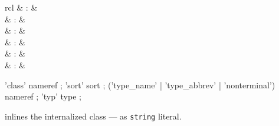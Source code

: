 \begin{isabellebody}
\begin{isamarkuptext}
\begin{description}
  \end{description}%
\end{isamarkuptext}%
\isamarkuptrue%
%
\endisatagmlref
{\isafoldmlref}%
%
\isadelimmlref
%
\endisadelimmlref
%
\isadelimmlantiq
%
\endisadelimmlantiq
%
\isatagmlantiq
%
\begin{isamarkuptext}%
\begin{matharray}{rcl}
  \hypertarget{ML antiquotation.class}{\hyperlink{ML antiquotation.class}{\mbox{}}} & : &  \\
  \hypertarget{ML antiquotation.sort}{\hyperlink{ML antiquotation.sort}{\mbox{}}} & : &  \\
  \hypertarget{ML antiquotation.type-name}{\hyperlink{ML antiquotation.type-name}{\mbox{}}} & : &  \\
  \hypertarget{ML antiquotation.type-abbrev}{\hyperlink{ML antiquotation.type-abbrev}{\mbox{}}} & : &  \\
  \hypertarget{ML antiquotation.nonterminal}{\hyperlink{ML antiquotation.nonterminal}{\mbox{}}} & : &  \\
  \hypertarget{ML antiquotation.typ}{\hyperlink{ML antiquotation.typ}{\mbox{}}} & : &  \\
  \end{matharray}

  \begin{rail}
  'class' nameref
  ;
  'sort' sort
  ;
  ('type_name' | 'type_abbrev' | 'nonterminal') nameref
  ;
  'typ' type
  ;
  \end{rail}

  \begin{description}

  \item {} inlines the internalized class  --- as \verb|string| literal.


\end{description}
\end{isamarkuptext}
\end{isabellebody}
